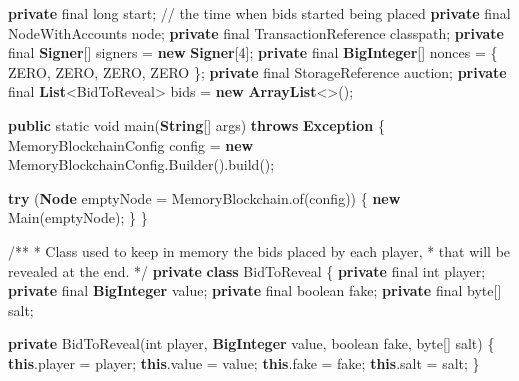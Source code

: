 \documentclass[a4paper,]{book}
\newenvironment{Shaded}{\begin{snugshade}}{\end{snugshade}}
\newcommand{\BuiltInTok}[1]{\textcolor[rgb]{0.39,0.29,0.61}{\textbf{#1}}}
\newcommand{\CommentTok}[1]{\textcolor[rgb]{0.54,0.53,0.53}{#1}}
\newcommand{\DataTypeTok}[1]{\textcolor[rgb]{0.00,0.34,0.68}{#1}}
\newcommand{\DecValTok}[1]{\textcolor[rgb]{0.69,0.50,0.00}{#1}}
\newcommand{\FunctionTok}[1]{\textcolor[rgb]{0.39,0.29,0.61}{#1}}
\newcommand{\KeywordTok}[1]{\textcolor[rgb]{0.12,0.11,0.11}{\textbf{#1}}}
\newcommand{\NormalTok}[1]{\textcolor[rgb]{0.12,0.11,0.11}{#1}}
\renewenvironment{Shaded}{\begin{snugshade}\small}{\end{snugshade}}
\begin{document}
{\begin{Shaded}
\begin{Highlighting}[]
  \KeywordTok{private} \DataTypeTok{final} \DataTypeTok{long}\NormalTok{ start;  }\CommentTok{// the time when bids started being placed}
  \KeywordTok{private} \DataTypeTok{final}\NormalTok{ NodeWithAccounts node;}
  \KeywordTok{private} \DataTypeTok{final}\NormalTok{ TransactionReference classpath;}
  \KeywordTok{private} \DataTypeTok{final} \BuiltInTok{Signer}\NormalTok{[] signers = }\KeywordTok{new} \BuiltInTok{Signer}\NormalTok{[}\DecValTok{4}\NormalTok{];}
  \KeywordTok{private} \DataTypeTok{final} \BuiltInTok{BigInteger}\NormalTok{[] nonces = \{ ZERO, ZERO, ZERO, ZERO \};}
  \KeywordTok{private} \DataTypeTok{final}\NormalTok{ StorageReference auction;}
  \KeywordTok{private} \DataTypeTok{final} \BuiltInTok{List}\NormalTok{<BidToReveal> bids = }\KeywordTok{new} \BuiltInTok{ArrayList}\NormalTok{<>();}

  \KeywordTok{public} \DataTypeTok{static} \DataTypeTok{void} \FunctionTok{main}\NormalTok{(}\BuiltInTok{String}\NormalTok{[] args) }\KeywordTok{throws} \BuiltInTok{Exception}\NormalTok{ \{}
\NormalTok{    MemoryBlockchainConfig config = }\KeywordTok{new}\NormalTok{ MemoryBlockchainConfig.}\FunctionTok{Builder}\NormalTok{().}\FunctionTok{build}\NormalTok{();}

    \KeywordTok{try}\NormalTok{ (}\BuiltInTok{Node}\NormalTok{ emptyNode = MemoryBlockchain.}\FunctionTok{of}\NormalTok{(config)) \{}
        \KeywordTok{new} \FunctionTok{Main}\NormalTok{(emptyNode);}
\NormalTok{    \}}
\NormalTok{  \}}

  \CommentTok{/**}
   \CommentTok{*}\NormalTok{ Class used to keep in memory the bids placed by each player}\CommentTok{,}
   \CommentTok{*}\NormalTok{ that will be revealed at the end}\CommentTok{.}
   \CommentTok{*/}
  \KeywordTok{private} \KeywordTok{class}\NormalTok{ BidToReveal \{}
    \KeywordTok{private} \DataTypeTok{final} \DataTypeTok{int}\NormalTok{ player;}
    \KeywordTok{private} \DataTypeTok{final} \BuiltInTok{BigInteger}\NormalTok{ value;}
    \KeywordTok{private} \DataTypeTok{final} \DataTypeTok{boolean}\NormalTok{ fake;}
    \KeywordTok{private} \DataTypeTok{final} \DataTypeTok{byte}\NormalTok{[] salt;}

    \KeywordTok{private} \FunctionTok{BidToReveal}\NormalTok{(}\DataTypeTok{int}\NormalTok{ player, }\BuiltInTok{BigInteger}\NormalTok{ value, }\DataTypeTok{boolean}\NormalTok{ fake, }\DataTypeTok{byte}\NormalTok{[] salt) \{}
      \KeywordTok{this}\NormalTok{.}\FunctionTok{player}\NormalTok{ = player;}
      \KeywordTok{this}\NormalTok{.}\FunctionTok{value}\NormalTok{ = value;}
      \KeywordTok{this}\NormalTok{.}\FunctionTok{fake}\NormalTok{ = fake;}
      \KeywordTok{this}\NormalTok{.}\FunctionTok{salt}\NormalTok{ = salt;}
\NormalTok{    \}}


\end{Highlighting}
\end{Shaded}}
\end{document}
